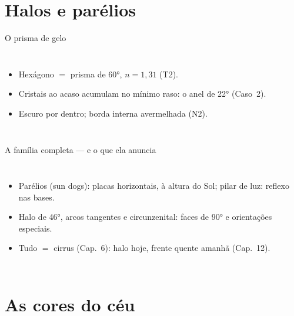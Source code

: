 \documentclass[aspectratio=169,11pt]{beamer}
\begin{document}
\section{Halos e parélios}

\begin{frame}{O prisma de gelo}
  \begin{columns}
    \vspace{0.4em}
    \begin{itemize}
      \item Hexágono $=$ prisma de 60°, $n = 1{,}31$ (T2).
      \item Cristais ao acaso acumulam no mínimo raso: o anel de
            22° (Caso~2).
      \item Escuro por dentro; borda interna avermelhada (N2).
    \end{itemize}
  \end{columns}
\end{frame}

\begin{frame}{A família completa — e o que ela anuncia}
  \begin{columns}
    \begin{itemize}
      \item Parélios (sun dogs): placas horizontais, à altura do
            Sol; pilar de luz: reflexo nas bases.
      \item Halo de 46°, arcos tangentes e circunzenital: faces de
            90° e orientações especiais.
      \item Tudo $=$ \alert{cirrus} (Cap.~6): halo hoje, frente
            quente amanhã (Cap.~12).
    \end{itemize}
  \end{columns}
\end{frame}

\section{As cores do céu}
\end{document}
